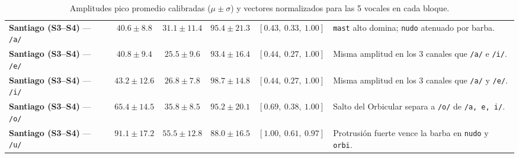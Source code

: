 \documentclass[11pt, a4paper]{article}
\begin{document}
\begin{table}[H]
\begin{tabularx}{\textwidth}{l c c c c X}
\midrule
\textbf{Santiago (S3--S4)} --- \texttt{/a/} & $40.6 \pm 8.8$  & $31.1 \pm 11.4$ & $\mathbf{95.4 \pm 21.3}$ & $\mathbf{[0.43,\ 0.33,\ 1.00]}$ & \texttt{mast} alto domina; \texttt{nudo} atenuado por barba. \\
\textbf{Santiago (S3--S4)} --- \texttt{/e/} & $40.8 \pm 9.4$  & $25.5 \pm 9.6$  & $\mathbf{93.4 \pm 16.4}$ & $\mathbf{[0.44,\ 0.27,\ 1.00]}$ & Misma amplitud en los 3 canales que \texttt{/a/} e \texttt{/i/}. \\
\textbf{Santiago (S3--S4)} --- \texttt{/i/} & $43.2 \pm 12.6$ & $26.8 \pm 7.8$  & $\mathbf{98.7 \pm 14.8}$ & $\mathbf{[0.44,\ 0.27,\ 1.00]}$ & Misma amplitud en los 3 canales que \texttt{/a/} y \texttt{/e/}. \\
\textbf{Santiago (S3--S4)} --- \texttt{/o/} & $\mathbf{65.4 \pm 14.5}$ & $\mathbf{35.8 \pm 8.5}$  & $95.2 \pm 20.1$ & $\mathbf{[0.69,\ 0.38,\ 1.00]}$ & Salto del Orbicular separa a \texttt{/o/} de \texttt{/a, e, i/}. \\
\textbf{Santiago (S3--S4)} --- \texttt{/u/} & $\mathbf{91.1 \pm 17.2}$ & $\mathbf{55.5 \pm 12.8}$ & $88.0 \pm 16.5$ & $\mathbf{[1.00,\ 0.61,\ 0.97]}$ & Protrusión fuerte vence la barba en \texttt{nudo} y \texttt{orbi}. \\
\bottomrule
\end{tabularx}
\caption{Amplitudes pico promedio calibradas ($\mu \pm \sigma$) y vectores normalizados para las 5 vocales en cada bloque.}
\label{tab:amplitudes_reales}
\end{table}
\end{document}
